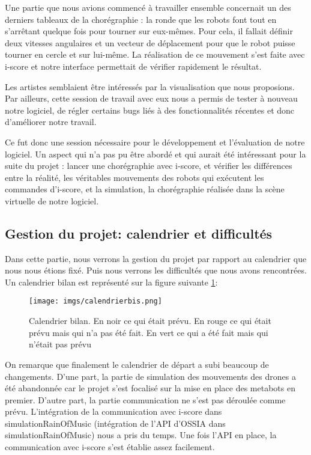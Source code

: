 Une partie que nous avions commencé à travailler ensemble concernait un des derniers tableaux de la chorégraphie : la ronde que les robots font tout en s'arrêtant quelque fois pour tourner sur eux-mêmes. Pour cela, il fallait définir deux vitesses angulaires et un vecteur de déplacement pour que le robot puisse tourner en cercle et sur lui-même. La réalisation de ce mouvement s'est faite avec i-score et notre interface permettait de vérifier rapidement le résultat. 

Les artistes semblaient être intéressés par la visualisation que nous proposions. Par ailleurs, cette session de travail avec eux nous a permis de tester à nouveau notre logiciel, de régler certains bugs liés à des fonctionnalités récentes et donc d'améliorer notre travail. 

Ce fut donc une session nécessaire pour le développement et l'évaluation de notre logiciel. Un aspect qui n'a pas pu être abordé et qui aurait été intéressant pour la suite du projet : lancer une chorégraphie avec i-score, et vérifier les différences entre la réalité, les véritables mouvements des robots qui exécutent les commandes d'i-score, et la simulation, la chorégraphie réalisée dans la scène virtuelle de notre logiciel.

\subsection{Gestion du projet: calendrier et difficultés}

Dans cette partie, nous verrons la gestion du projet par rapport au calendrier que nous nous étions fixé. Puis nous verrons les difficultés que nous avons rencontrées. Un calendrier bilan est représenté sur la figure suivante \ref{cal}:

\begin{figure}[H]
  \begin{center}
  	\texttt{[image: imgs/calendrierbis.png]}
  	\caption{Calendrier bilan. En noir ce qui était prévu. En rouge ce qui était prévu mais qui n'a pas été fait. En vert ce qui a été fait mais qui n'était pas prévu}
  	\label{cal}
  \end{center}
\end{figure}

On remarque que finalement le calendrier de départ a subi beaucoup de changements. D'une part, la partie de simulation des mouvements des drones a été abandonnée car le projet s'est focalisé sur la mise en place des metabots en premier. D'autre part, la partie communication ne s'est pas déroulée comme prévu. L'intégration de la communication avec i-score dans simulationRainOfMusic (intégration de l'API d'OSSIA dans simulationRainOfMusic) nous a pris du temps. Une fois l'API en place, la communication avec i-score s'est établie assez facilement. 

